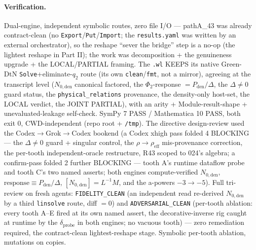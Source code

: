 \paragraph{Verification.}
Dual-engine, independent symbolic routes, zero file I/O --- pathA\_43 was already contract-clean (no
\texttt{Export}/\texttt{Put}/\texttt{Import}; the \texttt{results.yaml} was written by an external
orchestrator), so the reshape ``sever the bridge'' step is a no-op (the lightest reshape in Part II);
the work was decomposition + the genuineness upgrade + the LOCAL/PARTIAL framing. The \texttt{.wl}
KEEPS its native Green-DtN \texttt{Solve}+eliminate-\(q_2\) route (its own \texttt{clean}/\texttt{fmt},
not a mirror), agreeing at the transcript level (\(N_{0,\mathrm{den}}\) canonical factored, the
\(\Phi_2\)-response \(=P_{\mathrm{den}}/\Delta\), the \(\Delta\ne0\) guard status, the
\texttt{physical\_relations} provenance, the density-only host-set, the LOCAL verdict, the JOINT
PARTIAL), with an arity + Module-result-shape + unevaluated-leakage self-check. SymPy 7 PASS /
Mathematica 10 PASS, both exit 0, CWD-independent (repo root + \texttt{/tmp}). The directive
design-review used the Codex\(\to\)Grok\(\to\)Codex bookend (a Codex xhigh pass folded 4 BLOCKING ---
the \(\Delta\ne0\) guard + singular control, the \(\rho\to\rho_{\mathrm{eff}}\) mis-provenance
correction, the per-tooth independent-oracle restructure, R43 scoped to 024's algebra; a confirm-pass
folded 2 further BLOCKING --- tooth A's runtime dataflow probe and tooth C's two named asserts; both
engines compute-verified \(N_{0,\mathrm{den}}\), \(\mathrm{response}\equiv P_{\mathrm{den}}/\Delta\),
\([N_{0,\mathrm{den}}]=L^{-1}M\), and the a-powers \(-3\to-5\)). Full tri-review on fresh agents:
\texttt{FIDELITY\_CLEAN} (an independent read re-derived \(N_{0,\mathrm{den}}\) by a third
\texttt{linsolve} route, diff \(=0\)) and \texttt{ADVERSARIAL\_CLEAN} (per-tooth ablation: every tooth
A--E fired at its own named assert, the decorative-inverse rig caught at runtime by the
\(\delta_{\mathrm{probe}}\) in both engines; no vacuous tooth) --- zero remediation required, the
contract-clean lightest-reshape stage. Symbolic per-tooth ablation, mutations on copies.
